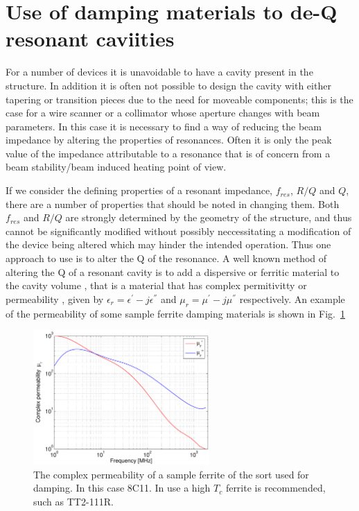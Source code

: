 \section{Use of damping materials to de-Q resonant caviities}
\label{sec:damping_materials}

For a number of devices it is unavoidable to have a cavity present in the structure. In addition it is often not possible to design the cavity with either tapering or transition pieces due to the need for moveable components; this is the case for a wire scanner or a collimator whose aperture changes with beam parameters. In this case it is necessary to find a way of reducing the beam impedance by altering the properties of resonances. Often it is only the peak value of the impedance attributable to a resonance that is of concern from a beam stability/beam induced heating point of view. 

If we consider the defining properties of a resonant impedance, $f_{res}$, $R/Q$ and $Q$, there are a number of properties that should be noted in changing them. Both $f_{res}$ and $R/Q$ are strongly determined by the geometry of the structure, and thus cannot be significantly modified without possibly neccessitating a modification of the device being altered which may hinder the intended operation. Thus one approach to use is to alter the Q of the resonance. A well known method of altering the Q of a resonant cavity is to add a dispersive or ferritic material to the cavity volume \cite{Klingbeil:ferrCav}, that is a material that has complex permitivitty or permeability , given by $\epsilon_{r} = \epsilon^{'} - j \epsilon^{''}$ and $\mu_{r} = \mu^{'} - j \mu^{''}$ respectively. An example of the permeability of some sample ferrite damping materials is shown in Fig.~\ref{fig:ferr_mu_damp}

\begin{figure}
\begin{center}
\includegraphics[width=0.6\textwidth]{Beam_Coupling_Impedance_Reduction_Techniques/figures/Ferrite8C11.pdf}
\end{center}
\caption{The complex permeability of a sample ferrite of the sort used for damping. In this case 8C11. In use a high $T_{c}$ ferrite is recommended, such as TT2-111R.}
\label{fig:ferr_mu_damp}
\end{figure}

